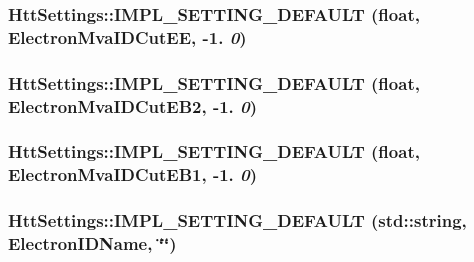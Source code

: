 \label{classHttSettings_a4320a54adcb8df7075bc219c9c21a098}
\hypertarget{classHttSettings_ac290c24384bca58c474b0c2b97c2a382}{
\subsubsection[{IMPL\_\-SETTING\_\-DEFAULT}]{\setlength{\rightskip}{0pt plus 5cm}HttSettings::IMPL\_\-SETTING\_\-DEFAULT (float, \/  ElectronMvaIDCutEE, \/  -\/1. {\em 0})}}
\label{classHttSettings_ac290c24384bca58c474b0c2b97c2a382}
\hypertarget{classHttSettings_afd05c28dd3bb00cf4732a0bc87901b34}{
\subsubsection[{IMPL\_\-SETTING\_\-DEFAULT}]{\setlength{\rightskip}{0pt plus 5cm}HttSettings::IMPL\_\-SETTING\_\-DEFAULT (float, \/  ElectronMvaIDCutEB2, \/  -\/1. {\em 0})}}
\label{classHttSettings_afd05c28dd3bb00cf4732a0bc87901b34}
\hypertarget{classHttSettings_a147c34ffb4aeb6b02f2a02f37dc59781}{
\subsubsection[{IMPL\_\-SETTING\_\-DEFAULT}]{\setlength{\rightskip}{0pt plus 5cm}HttSettings::IMPL\_\-SETTING\_\-DEFAULT (float, \/  ElectronMvaIDCutEB1, \/  -\/1. {\em 0})}}
\label{classHttSettings_a147c34ffb4aeb6b02f2a02f37dc59781}
\hypertarget{classHttSettings_a003594f674aeb36ae7f899e790b819ed}{
\subsubsection[{IMPL\_\-SETTING\_\-DEFAULT}]{\setlength{\rightskip}{0pt plus 5cm}HttSettings::IMPL\_\-SETTING\_\-DEFAULT (std::string, \/  ElectronIDName, \/  \char`\"{}\char`\"{})}}
\label{classHttSettings_a003594f674aeb36ae7f899e790b819ed}
